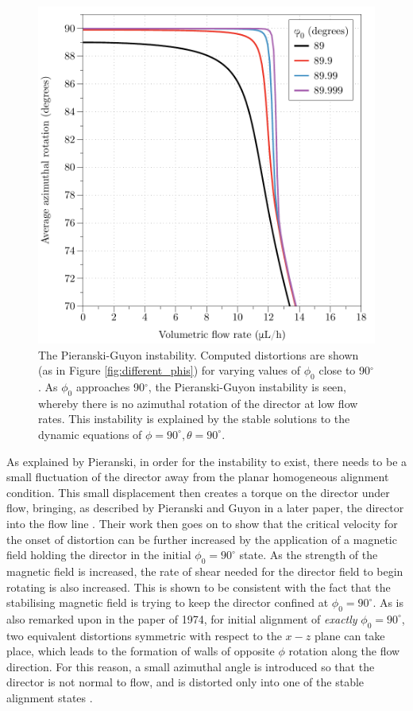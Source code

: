 \begin{figure}
\begin{center}
\includegraphics{Figures/45/pieranski}
\end{center}
\caption[The Pieranski-Guyon instability]{\label{fig:Pieranski_Guyon_instability} The Pieranski-Guyon instability. Computed distortions are shown (as in Figure \ref{fig:different_phis}) for varying values of $\phi_0$ close to 90$^{\circ}$. As $\phi_0$ approaches 90$^{\circ}$, the Pieranski-Guyon instability is seen, whereby there is no azimuthal rotation of the director at low flow rates. This instability is explained by the stable solutions to the dynamic equations of $\phi=90^{\circ},\theta=90^{\circ}$.}
\end{figure}

As explained by Pieranski, in order for the instability to exist, there needs to be a small fluctuation of the director away from the planar homogeneous alignment condition. This small displacement then creates a torque on the director under flow, bringing, as described by Pieranski and Guyon in a later paper, the director into the flow line \cite{Pieranski1974}. Their work then goes on to show that the critical velocity for the onset of distortion can be further increased by the application of a magnetic field holding the director in the initial $\phi_0=90^{\circ}$ state. As the strength of the magnetic field is increased, the rate of shear needed for the director field to begin rotating is also increased. This is shown to be consistent with the fact that the stabilising magnetic field is trying to keep the director confined at $\phi_0=90^{\circ}$. As is also remarked upon in the paper of 1974, for initial alignment of \textit{exactly} $\phi_0=90^{\circ}$, two equivalent distortions symmetric with respect to the $x-z$ plane can take place, which leads to the formation of walls of opposite $\phi$ rotation along the flow direction. For this reason, a small azimuthal angle is introduced so that the director is not normal to flow, and is distorted only into one of the stable alignment states \cite{Pieranski1974}.

